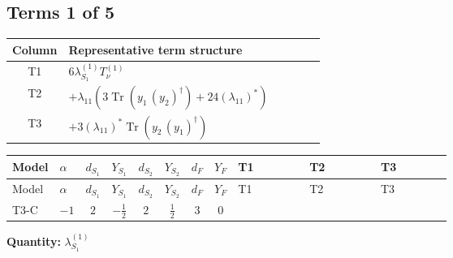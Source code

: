 \documentclass[8pt]{article}
\begin{document}
\begin{landscape}
\subsection*{Terms 1 of 5}
\begin{center}
\begin{tabular}{@{}c >{\raggedright\arraybackslash}p{0.82\linewidth}@{}}
\toprule
Column & Representative term structure \\
\midrule
T1 & \(\displaystyle 6 {\lambda_{S_1}^{(1)}} T_{\nu}^{(1)}\) \\
\midrule
T2 & \(\displaystyle +{\lambda_{11}} (3 \operatorname{Tr}\!\left({y_1}\,\left({y_2}\right)^{\dagger}\right)+24 \left({\lambda_{11}}\right)^{*})\) \\
\midrule
T3 & \(\displaystyle +3 \left({\lambda_{11}}\right)^{*} \operatorname{Tr}\!\left({y_2}\,\left({y_1}\right)^{\dagger}\right)\) \\
\midrule
\bottomrule
\end{tabular}
\end{center}
\smallskip
\tiny
\begin{longtable}{@{}llcccccc >{\raggedright\arraybackslash}p{0.21\linewidth} >{\raggedright\arraybackslash}p{0.21\linewidth} >{\raggedright\arraybackslash}p{0.21\linewidth}@{}}
\toprule
Model & $\alpha$ & $d_{S_1}$ & $Y_{S_1}$ & $d_{S_2}$ & $Y_{S_2}$ & $d_F$ & $Y_F$ & T1 & T2 & T3 \\
\midrule
\endfirsthead
\toprule
Model & $\alpha$ & $d_{S_1}$ & $Y_{S_1}$ & $d_{S_2}$ & $Y_{S_2}$ & $d_F$ & $Y_F$ & T1 & T2 & T3 \\
\midrule
\endhead
T3-C & $-1$ & $2$ & $-\frac{1}{2}$ & $2$ & $\frac{1}{2}$ & $3$ & $0$ & \scriptsize\adjustbox{max width=\linewidth}{$\begin{gathered} 6 {\lambda_{S_1}^{(1)}} T_{\nu}^{(1)}\end{gathered}$} & \scriptsize\adjustbox{max width=\linewidth}{$\begin{gathered} +{\lambda_{11}} (3 \operatorname{Tr}\!\left({y_1}\,\left({y_2}\right)^{\dagger}\right)+24 \left({\lambda_{11}}\right)^{*})\end{gathered}$} & \scriptsize\adjustbox{max width=\linewidth}{$\begin{gathered} +3 \left({\lambda_{11}}\right)^{*} \operatorname{Tr}\!\left({y_2}\,\left({y_1}\right)^{\dagger}\right)\end{gathered}$} \\
\midrule
\bottomrule
\end{longtable}
\clearpage
\noindent\textbf{Quantity: }$\lambda_{S_1}^{(1)}$\par\smallskip

\end{landscape}
\end{document}
